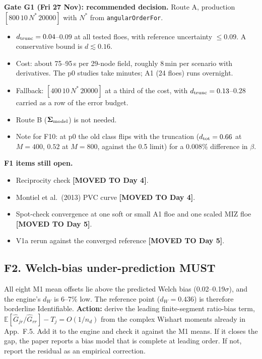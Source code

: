\documentclass[10pt,a4paper]{article}
\newcommand{\MUST}{\textcolor{must}{\textbf{MUST}}}
\newcommand{\MOVED}[1]{\textcolor{moved}{\textbf{[MOVED TO #1]}}}
\begin{document}
\textbf{Gate G1 (Fri 27 Nov): recommended decision.} Route A, production $[800\,10\,N^*\,20000]$ with $N^*$ from \texttt{angularOrderFor}.
\begin{itemize}
\item $d_{\rm trunc}=0.04$--$0.09$ at all tested floes, with reference uncertainty $\le0.09$. A conservative bound is $d\lesssim0.16$.
\item Cost: about 75--95\,s per 29-node field, roughly 8\,min per scenario with derivatives. The p0 studies take minutes; A1 (24 floes) runs overnight.
\item Fallback: $[400\,10\,N^*\,20000]$ at a third of the cost, with $d_{\rm trunc}=0.13$--$0.28$ carried as a row of the error budget.
\item Route B ($\boldsymbol\Sigma_{\rm model}$) is not needed.
\item Note for F10: at p0 the old class flips with the truncation ($d_{\rm tot}=0.66$ at $M=400$, $0.52$ at $M=800$, against the 0.5 limit) for a $0.008\%$ difference in $\beta$.
\end{itemize}

\textbf{F1 items still open.}
\begin{itemize}
\item Reciprocity check \MOVED{Day 4}.
\item Montiel et al.\ (2013) PVC curve \MOVED{Day 4}.
\item Spot-check convergence at one soft or small A1 floe and one scaled MIZ floe \MOVED{Day 5}.
\item V1a rerun against the converged reference \MOVED{Day 5}.
\end{itemize}

\subsection*{F2. Welch-bias under-prediction \MUST}
All eight M1 mean offsets lie above the predicted Welch bias (0.02--0.19$\sigma$), and the engine's $d_W$ is 6--7\% low. The reference point ($d_W=0.436$) is therefore borderline Identifiable.
\textbf{Action:} derive the leading finite-segment ratio-bias term, $\mathbb{E}[\hat G_{jr}/\hat G_{rr}]-T_j=O(1/n_d)$ from the complex Wishart moments already in App.~F.5. Add it to the engine and check it against the M1 means. If it closes the gap, the paper reports a bias model that is complete at leading order. If not, report the residual as an empirical correction.
\end{document}

